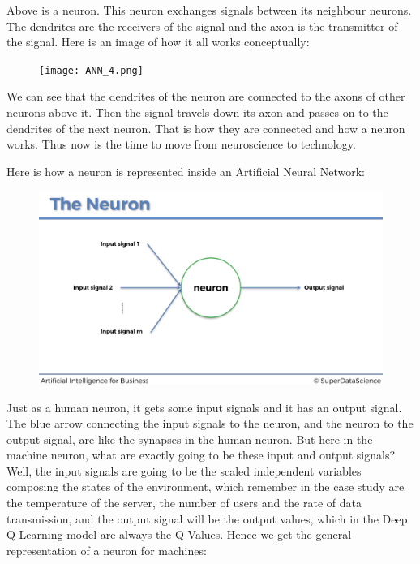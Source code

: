\documentclass[]{book}
\begin{document}
Above is a neuron. This neuron exchanges signals between its neighbour neurons. The dendrites are the receivers of the signal and the axon is the transmitter of the signal. Here is an image of how it all works conceptually:

\begin{figure}[!htbp]
        \begin{center}
            \texttt{[image: ANN\_4.png]}
        \end{center}
\end{figure}

We can see that the dendrites of the neuron are connected to the axons of other neurons above it. Then the signal travels down its axon and passes on to the dendrites of the next neuron. That is how they are connected and how a neuron works. Thus now is the time to move from neuroscience to technology.

Here is how a neuron is represented inside an Artificial Neural Network:

\begin{figure}[!htbp]
        \begin{center}
            \includegraphics[scale=0.175]{ANN_5.png}
        \end{center}
\end{figure}

Just as a human neuron, it gets some input signals and it has an output signal. The blue arrow connecting the input signals to the neuron, and the neuron to the output signal, are like the synapses in the human neuron. But here in the machine neuron, what are exactly going to be these input and output signals? Well, the input signals are going to be the scaled independent variables composing the states of the environment, which remember in the case study are the temperature of the server, the number of users and the rate of data transmission, and the output signal will be the output values, which in the Deep Q-Learning model are always the Q-Values. Hence we get the general representation of a neuron for machines:
\end{document}
